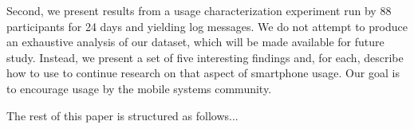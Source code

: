 

Second, we present results from a usage characterization experiment run by 88
\PhoneLab{} participants for 24 days and yielding  log messages.
We do not attempt to produce an exhaustive analysis of our dataset, which
will be made available for future study. Instead, we present a set of
 five interesting findings and, for each, describe how to use
\PhoneLab{} to continue research on that aspect of smartphone usage. Our goal
is to encourage \PhoneLab{} usage by the mobile systems community.

The rest of this paper is structured as follows...

